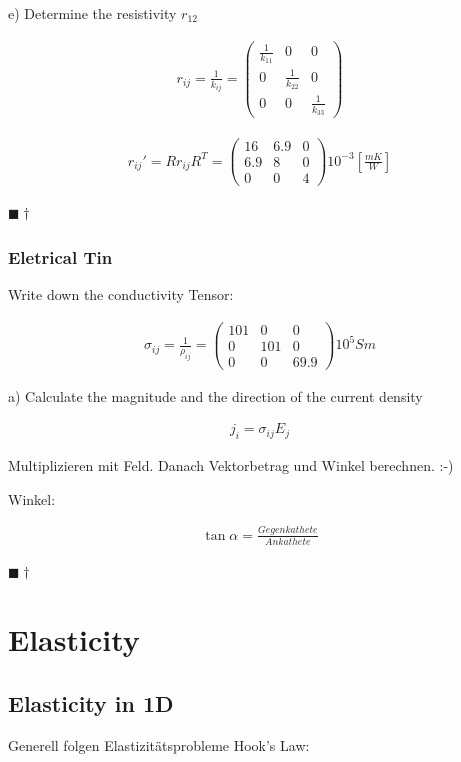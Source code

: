 \documentclass[a4paper]{scrartcl}
\newcommand{\qed}{\begin{flushright}
$\blacksquare \dagger$ \end{flushright}}
\begin{document}
e) Determine the resistivity $r_{12}$

\begin{align}
r_{ij}=\frac{1}{k_{ij}}=\begin{pmatrix}
\frac{1}{k_{11}} & 0 & 0 \\
0 & \frac{1}{k_{22}} & 0 \\
0 & 0 & \frac{1}{k_{33}}
\end{pmatrix}
\end{align}

\begin{align}
r_{ij}'=Rr_{ij}R^{T} = \begin{pmatrix}
16 & 6.9 & 0 \\
6.9 & 8 & 0 \\
0 & 0 & 4
\end{pmatrix}
10^{-3}[\frac{mK}{W}] 
\end{align}
\qed




\subsubsection{Eletrical Tin}
Write down the conductivity Tensor:

\begin{align}
\sigma_{ij} = \frac{1}{\rho_{ij}}= \begin{pmatrix}
101 & 0 & 0 \\
0 & 101 & 0 \\
0 & 0 & 69.9 
\end{pmatrix}
10^5 Sm
\end{align}

a) Calculate the magnitude and the direction of the current density

\begin{align}
j_i=\sigma_{ij}E_j
\end{align}

Multiplizieren mit Feld. Danach Vektorbetrag und Winkel berechnen. :-)

Winkel:

\begin{align}
\tan{\alpha}=\frac{Gegenkathete}{Ankathete}
\end{align}
\qed

\section{Elasticity}
\subsection{Elasticity in 1D}
Generell folgen Elastizitätsprobleme Hook's Law:
\end{document}
